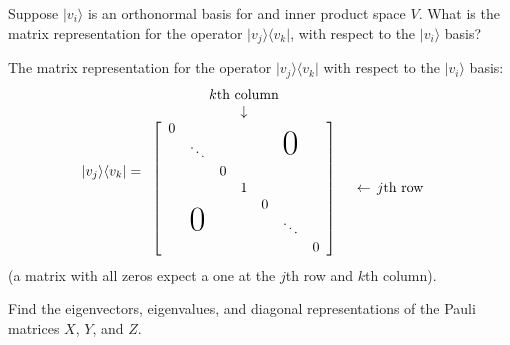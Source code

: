 \documentclass[en]{sol-man}
\begin{document}
\begin{exe}
    Suppose $\lvert v_i\rangle$ is an orthonormal basis for and inner product space $V$. What is the matrix representation for the operator $\lvert v_j\rangle\langle v_k\rvert$, with respect to the $\lvert v_i\rangle$ basis?
\end{exe}
\begin{sol}
    The matrix representation for the operator $\lvert v_j\rangle\langle v_k\rvert$ with respect to the $\lvert v_i\rangle$ basis:
    \begin{align}
        \lvert v_j\rangle\langle v_k\rvert=\begin{array}{cc}
            \begin{array}{ccccccc}
                \multicolumn{7}{c}{k\text{th column}} \\
                 &  &  & \downarrow &  &  & 
                \end{array} & \begin{array}{c}
                    \\
                    \\
                   \end{array} \\
            \left[\begin{array}{ccccccc}
                0 &  &  &  & \multicolumn{3}{c}{\multirow{3}{*}{\Huge0}} \\
                 & \ddots &  &  & \multicolumn{3}{c}{} \\
                 &  & 0 &  & \multicolumn{3}{c}{} \\
                 &  &  & 1 &  &  &  \\
                \multicolumn{3}{c}{\multirow{3}{*}{\Huge0}} &  & 0 &  &  \\
                \multicolumn{3}{c}{} &  &  & \ddots &  \\
                \multicolumn{3}{c}{} &  &  &  & 0
                \end{array}\right] & \begin{array}{c}
                    \\
                    \\
                    \\
                   \leftarrow\,j\text{th row} \\
                    \\
                    \\
                    \\
                   \end{array}
        \end{array}
    \end{align}
    (a matrix with all zeros expect a one at the $j$th row and $k$th column).
\end{sol}

\begin{exe}
    Find the eigenvectors, eigenvalues, and diagonal representations of the Pauli matrices $X$, $Y$, and $Z$.
\end{exe}
\begin{sol}
    
\end{sol}

\ifx\allfiles\undefined
\end{document}
